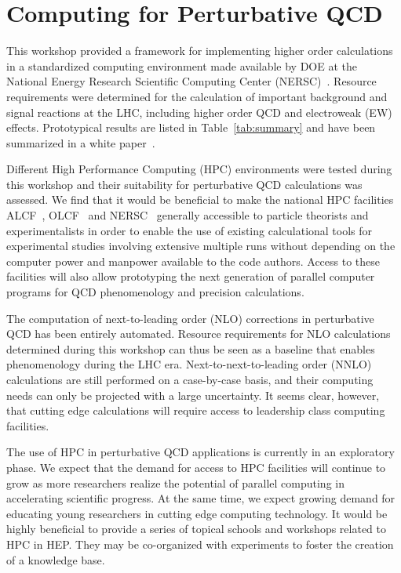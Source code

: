 
\section{Computing for Perturbative QCD}
\label{chap:PQCD}


This workshop provided a framework for implementing higher order  
calculations in a standardized computing environment made available 
by DOE at the National Energy Research Scientific Computing Center
(NERSC)~\cite{NERSC}.  Resource requirements were determined for the
calculation of important background and signal reactions at the
LHC, including higher order QCD and electroweak (EW) effects. Prototypical results 
are listed in Table~\ref{tab:summary} and have been summarized in a 
white paper~\cite{HPCWP}.

Different High Performance Computing (HPC) environments were tested
during this workshop and their suitability for perturbative QCD calculations 
was assessed. We find that it would be beneficial to make the national HPC 
facilities ALCF~\cite{ALCF}, OLCF~\cite{OLCF} and NERSC~\cite{NERSC} 
generally accessible to particle theorists and
experimentalists in order to enable the use of existing
calculational tools for experimental studies involving extensive
multiple runs without depending on the computer power and manpower
available to the code authors. Access to these facilities will also
allow prototyping the next generation of parallel computer programs
for QCD phenomenology and precision calculations.

The computation of next-to-leading order (NLO) corrections in 
perturbative QCD has been entirely
automated. Resource requirements for NLO calculations determined during 
this workshop can thus be seen as a baseline that enables phenomenology 
during the LHC era. Next-to-next-to-leading order (NNLO) calculations are still performed 
on a case-by-case basis, and their computing needs can only be 
projected with a large uncertainty. It seems clear, however, that cutting edge 
calculations will require access to leadership class computing facilities.

The use of HPC in perturbative QCD applications is currently in
an exploratory phase. We expect that the demand for access to HPC
facilities will continue to grow as more researchers realize the 
potential of parallel computing in accelerating scientific progress. 
At the same time, we expect growing demand for educating young researchers 
in cutting edge computing technology. It would be highly beneficial 
to provide a series of topical schools and workshops related 
to HPC in HEP. They may be co-organized with experiments to foster 
the creation of a knowledge base.

